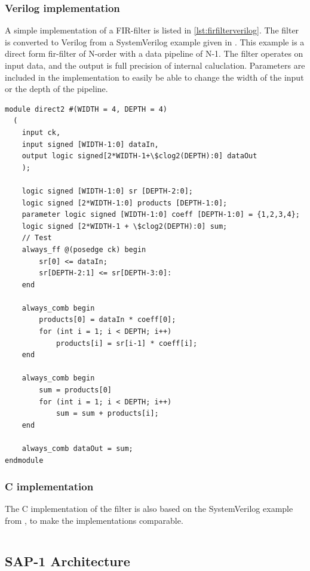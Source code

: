 \subsubsection{Verilog implementation}

A simple implementation of a FIR-filter is listed in \cref{lst:firfilterverilog}. The filter is converted to Verilog from a SystemVerilog example given in \cite{mehler2014digital}. This example is a direct form \gls{fir}-filter of N-order with a data pipeline of N-1. The filter operates on input data, and the output is full precision of internal caluclation. Parameters are included in the implementation to easily be able to change the width of the input or the depth of the pipeline.

\lstset{language=SystemVerilog, style=Verilogstyle}
\begin{lstlisting}[caption={FIR-filter implemented in Verilog},label=lst:firfilterverilog]
module direct2 #(WIDTH = 4, DEPTH = 4)
  (
	input ck, 
	input signed [WIDTH-1:0] dataIn,
	output logic signed[2*WIDTH-1+\$clog2(DEPTH):0] dataOut
	);
	
	logic signed [WIDTH-1:0] sr [DEPTH-2:0];
	logic signed [2*WIDTH-1:0] products [DEPTH-1:0];
	parameter logic signed [WIDTH-1:0] coeff [DEPTH-1:0] = {1,2,3,4};
	logic signed [2*WIDTH-1 + \$clog2(DEPTH):0] sum;
	// Test
	always_ff @(posedge ck) begin
		sr[0] <= dataIn;
		sr[DEPTH-2:1] <= sr[DEPTH-3:0]:
	end
	
	always_comb begin
		products[0] = dataIn * coeff[0];
		for (int i = 1; i < DEPTH; i++)
			products[i] = sr[i-1] * coeff[i];
	end
	
	always_comb begin
		sum = products[0]
		for (int i = 1; i < DEPTH; i++)
			sum = sum + products[i];
	end
	
	always_comb dataOut = sum;
endmodule
\end{lstlisting}
\subsubsection{C implementation}
The C implementation of the filter is also based on the SystemVerilog example from \cite{mehler2014digital}, to make the implementations comparable.
\lstset{language=C,style=Cstyle}
\begin{lstlisting}[caption={FIR-filter implemented in C},label=lst:firfilterc]

\end{lstlisting}


\subsection{SAP-1 Architecture}

